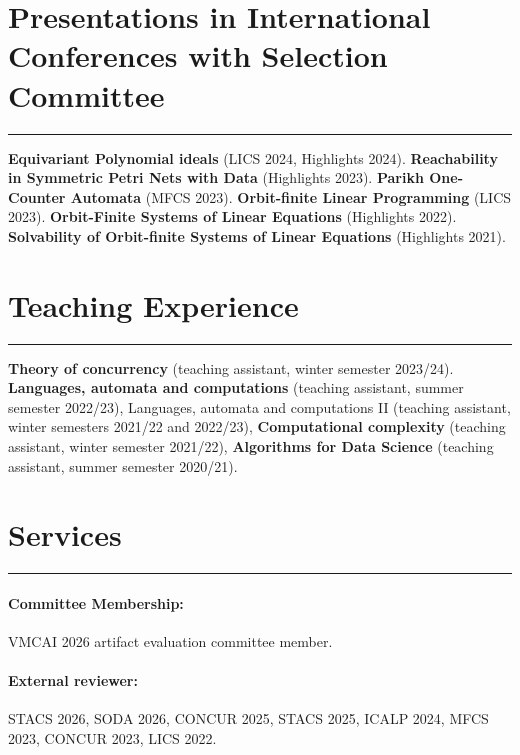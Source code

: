 \documentclass[11pt]{article}
\begin{document}
\section*{Presentations in International Conferences with Selection Committee}
\hrule
\smallskip

\textbf{Equivariant Polynomial ideals} (LICS 2024, Highlights 2024).
\textbf{Reachability in Symmetric Petri Nets with Data} (Highlights 2023).
\textbf{Parikh One-Counter Automata} (MFCS 2023).
\textbf{Orbit-finite Linear Programming} (LICS 2023).
\textbf{Orbit-Finite Systems of Linear Equations} (Highlights 2022).
\textbf{Solvability of Orbit-finite Systems of Linear Equations} (Highlights 2021).
%
%
%
%
%

\section*{Teaching Experience}
\hrule
\smallskip

\textbf{Theory of concurrency} (teaching assistant, winter semester 2023/24).
\textbf{Languages, automata and computations} (teaching assistant, summer semester 2022/23),
Languages, automata and computations II (teaching assistant, winter semesters 2021/22 and 2022/23),
\textbf{Computational complexity} (teaching assistant, winter semester 2021/22),
\textbf{Algorithms for Data Science} (teaching assistant, summer semester 2020/21).
\section*{Services}
\hrule
\smallskip

\paragraph*{Committee Membership:}
%
VMCAI 2026 artifact evaluation committee member.
%
\vspace{-10pt}
\paragraph*{External reviewer:}
STACS 2026,
SODA 2026,
CONCUR 2025,
STACS 2025,
ICALP 2024,
MFCS 2023,
CONCUR 2023,
LICS 2022.
%
%
%
%
\end{document}
